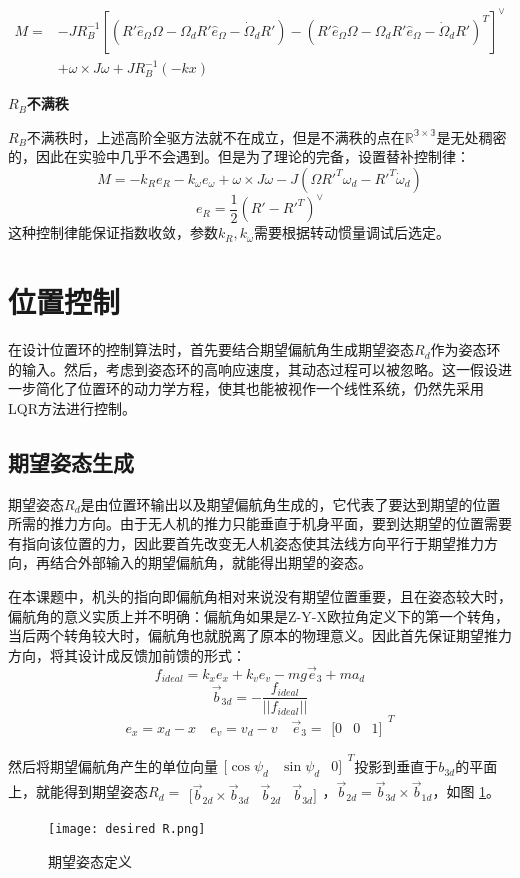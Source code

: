    $$ \begin{aligned}
        M=&-J R_B^{-1} [(R' \hat e_\Omega \Omega  -\Omega_d R' \hat e_\Omega -\dot \Omega_d R')-(R' \hat e_\Omega \Omega  -\Omega_d R' \hat e_\Omega -\dot \Omega_d R')^T]^\vee \\
         &+\omega \times J\omega + J R_B^{-1}(-kx)
    \end{aligned}$$

    \textbf{$R_B$不满秩}

    $R_B$不满秩时，上述高阶全驱方法就不在成立，但是不满秩的点在$\mathbb{R^{3 \times 3}}$是无处稠密的，因此在实验中几乎不会遇到。但是为了理论的完备，设置替补控制律\cite{Lee2010}：
    $$M=-k_R e_R-k_\omega e_\omega+\omega \times J \omega -J(\Omega R'^T \omega_d-R'^T \dot \omega_d) $$
    $$ e_R=\frac{1}{2} (R'-R'^T)^\vee $$
    这种控制律能保证指数收敛，参数$k_R,k_\omega$需要根据转动惯量调试后选定。
    \section{位置控制}
    在设计位置环的控制算法时，首先要结合期望偏航角生成期望姿态$R_d$作为姿态环的输入。然后，考虑到姿态环的高响应速度，其动态过程可以被忽略。这一假设进一步简化了位置环的动力学方程，使其也能被视作一个线性系统，仍然先采用LQR方法进行控制。

    
    \subsection{期望姿态生成}
    期望姿态$R_d$是由位置环输出以及期望偏航角生成的，它代表了要达到期望的位置所需的推力方向。由于无人机的推力只能垂直于机身平面，要到达期望的位置需要有指向该位置的力，因此要首先改变无人机姿态使其法线方向平行于期望推力方向，再结合外部输入的期望偏航角，就能得出期望的姿态\cite{Lee2010}。

    在本课题中，机头的指向即偏航角相对来说没有期望位置重要，且在姿态较大时，偏航角的意义实质上并不明确：偏航角如果是Z-Y-X欧拉角定义下的第一个转角，当后两个转角较大时，偏航角也就脱离了原本的物理意义。因此首先保证期望推力方向，将其设计成反馈加前馈的形式：
    $$f_{ideal}=k_x e_x+k_v e_v-mg \vec e_3+m a_d$$
    $$\vec b_{3d}=-\frac{f_{ideal}}{||f_{ideal}||}$$
    $$ e_x=x_d-x \quad e_v=v_d-v \quad \vec e_3=\begin{matrix}
        [0 & 0 & 1]
    \end{matrix}^T$$

    然后将期望偏航角产生的单位向量$\begin{matrix} [\cos{\psi_d} & \sin{\psi_d} & 0]  \end{matrix}^T$投影到垂直于$b_{3d}$的平面上，就能得到期望姿态$R_d= \begin{matrix} [ \vec b_{2d}\times \vec b_{3d} &\vec b_{2d} & \vec b_{3d}] \end{matrix}$，$\vec b_{2d}=\vec b_{3d} \times \vec b_{1d}$，如图 \ref{fig:2}。
    \begin{figure}[!h]
        \centering
        \texttt{[image: desired R.png]}
        \caption{期望姿态定义}
        \label{fig:2}
      \end{figure}

